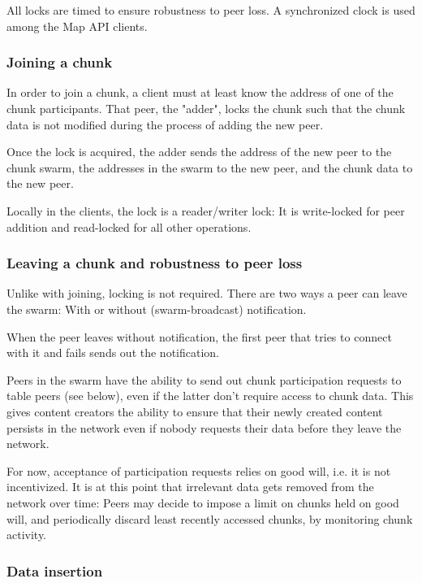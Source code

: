 \documentclass[a4paper, 10pt, conference]{ieeeconf}
\begin{document}
All locks are timed to ensure robustness to peer loss. A synchronized clock is
used among the Map API clients.

\subsubsection{Joining a chunk}

In order to join a chunk, a client must at least know the address of one of the
chunk participants. That peer, the "adder", locks the chunk such that the chunk
data is not modified during the process of adding the new peer.

Once the lock is acquired, the adder sends the address of the new peer to the
chunk swarm, the addresses in the swarm to the new peer, and the chunk data to
the new peer.

Locally in the clients, the lock is a reader/writer lock: It is write-locked
for peer addition and read-locked for all other operations.

\subsubsection{Leaving a chunk and robustness to peer loss}

Unlike with joining, locking is not required. There are two ways a peer can leave
the swarm: With or without (swarm-broadcast) notification.

When the peer leaves without notification, the first peer that tries to connect
with it and fails sends out the notification.

Peers in the swarm have the ability to send out chunk participation requests
to table peers (see below), even if the latter don't require access to chunk
data. This gives content creators the ability to ensure that their newly created
content persists in the network even if nobody requests their data before they
leave the network. 

For now, acceptance of participation requests relies on good will, i.e. it is 
not incentivized. It is at this point that irrelevant data gets removed from the
network over time: Peers may decide to impose a limit on chunks held on good
will, and periodically discard least recently accessed chunks, by monitoring
chunk activity.

\subsubsection{Data insertion}
\end{document}
